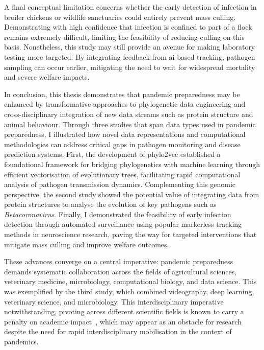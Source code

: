 A final conceptual limitation concerns whether the early detection of infection in broiler chickens or wildlife sanctuaries could entirely prevent mass culling. Demonstrating with high confidence that infection is confined to part of a flock remains extremely difficult, limiting the feasibility of reducing culling on this basis. Nonetheless, this study may still provide an avenue for making laboratory testing more targeted. By integrating feedback from \gls{ai}-based tracking, pathogen sampling can occur earlier, mitigating the need to wait for widespread mortality and severe welfare impacts.

In conclusion, this thesis demonstrates that pandemic preparedness may be enhanced by transformative approaches to phylogenetic data engineering and cross-disciplinary integration of new data streams such as protein structure and animal behaviour. Through three studies that span data types used in pandemic preparedness, I illustrated how novel data representations and computational methodologies can address critical gaps in pathogen monitoring and disease prediction systems. First, the development of phylo2vec established a foundational framework for bridging phylogenetics with machine learning through efficient vectorisation of evolutionary trees, facilitating rapid computational analysis of pathogen transmission dynamics. Complementing this genomic perspective, the second study showed the potential value of integrating data from protein structures to analyse the evolution of key pathogens such as \textit{Betacoronavirus}. Finally, I demonstrated the feasibility of early infection detection through automated surveillance using popular markerless tracking methods in neuroscience research, paving the way for targeted interventions that mitigate mass culling and improve welfare outcomes.

These advances converge on a central imperative: pandemic preparedness demands systematic collaboration across the fields of agricultural sciences, veterinary medicine, microbiology, computational biology, and data science. This was exemplified by the third study, which combined videography, deep learning, veterinary science, and microbiology. This interdisciplinary imperative notwithstanding, pivoting across different scientific fields is known to carry a penalty on academic impact~\cite{hill2025}, which may appear as an obstacle for research despite the need for rapid interdisciplinary mobilisation in the context of pandemics.

